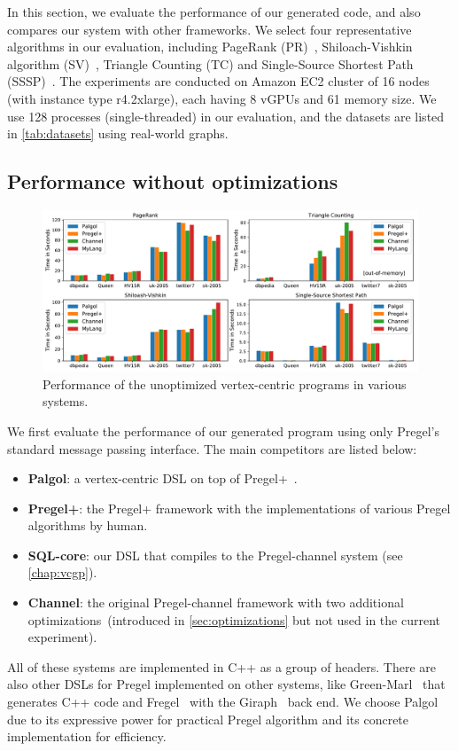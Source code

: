 \documentclass{sokendai_thesis} %
\begin{document}
In this section, we evaluate the performance of our generated code, and also compares our system with other frameworks.
We select four representative algorithms in our evaluation, including PageRank (PR)~\cite{google,pregel}, Shiloach-Vishkin algorithm (SV)~\cite{ShVi82,yan2015effective}, Triangle Counting (TC) and Single-Source Shortest Path (SSSP)~\cite{pregel}.
The experiments are conducted on Amazon EC2 cluster of 16 nodes (with instance type r4.2xlarge), each having 8 vGPUs and 61 memory size.
We use 128 processes (single-threaded) in our evaluation, and the datasets are listed in \autoref{tab:datasets} using real-world graphs.

\subsection{Performance without optimizations}

\begin{figure}
\centering
\includegraphics[width=\textwidth]{figures/performance.pdf}
\caption{Performance of the unoptimized vertex-centric programs in various systems.}
\label{fig:performance}
\end{figure}

We first evaluate the performance of our generated program using only Pregel's standard message passing interface.
The main competitors are listed below:
\begin{itemize}
  \item \textbf{Palgol}: a vertex-centric DSL on top of Pregel+~\cite{yan2015effective}.
  \item \textbf{Pregel+}: the Pregel+ framework with the implementations of various Pregel algorithms by human.
  \item \textbf{SQL-core}: our DSL that compiles to the Pregel-channel system (see \autoref{chap:vcgp}).
  \item \textbf{Channel}: the original Pregel-channel framework with two additional optimizations~(introduced in \autoref{sec:optimizations} but not used in the current experiment).
\end{itemize}
All of these systems are implemented in C++ as a group of headers.
There are also other DSLs for Pregel implemented on other systems, like Green-Marl~\cite{green14} that generates C++ code and Fregel~\cite{fregel} with the Giraph~\cite{giraph} back end.
We choose Palgol due to its expressive power for practical Pregel algorithm and its concrete implementation for efficiency.
\end{document}
